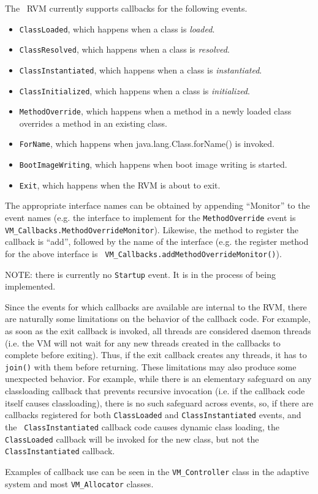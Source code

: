 The \jp\ RVM currently supports callbacks for the following events.
\begin{itemize}
\item {\tt ClassLoaded}, which happens when a class is {\em loaded}.
\item {\tt ClassResolved}, which happens when a class is {\em resolved}.
\item {\tt ClassInstantiated}, which happens when a class is {\em
instantiated}.
\item {\tt ClassInitialized}, which happens when a class is {\em initialized}.
\item {\tt MethodOverride}, which happens when a method in a newly loaded class
overrides a method in an existing class.
\item {\tt ForName}, which happens when java.lang.Class.forName() is invoked.
\item {\tt BootImageWriting}, which happens when boot image writing is started.
\item {\tt Exit}, which happens when the RVM is about to exit.
\end{itemize}
The appropriate interface names can be obtained by appending ``Monitor'' to the
event names (e.g. the interface to implement for the {\tt MethodOverride} event
is {\tt VM\_Callbacks.MethodOverrideMonitor}).  Likewise, the method to
register the callback is ``add'', followed by the name of the interface (e.g.
the register method for the above interface is {\tt
VM\_Callbacks.addMethodOverrideMonitor()}).

NOTE: there is currently no {\tt Startup} event.  It is in the process of being
implemented.

Since the events for which callbacks are available are internal to the RVM,
there are naturally some limitations on the behavior of the callback code.  For
example, as soon as the exit callback is invoked, all threads are considered
daemon threads (i.e. the VM will not wait for any new threads created in the
callbacks to complete before exiting).  Thus, if the exit callback creates any
threads, it has to {\tt join()} with them before returning.  These limitations
may also produce some unexpected behavior.  For example, while there is an
elementary safeguard on any classloading callback that prevents recursive
invocation (i.e. if the callback code itself causes classloading), there is no
such safeguard across events, so, if there are callbacks registered for both
{\tt ClassLoaded} and {\tt ClassInstantiated} events, and the {\tt
ClassInstantiated} callback code causes dynamic class loading, the {\tt
ClassLoaded} callback will be invoked for the new class, but not the {\tt
ClassInstantiated} callback.

Examples of callback use can be seen in the {\tt VM\_Controller} class in the
adaptive system and most {\tt VM\_Allocator} classes.

